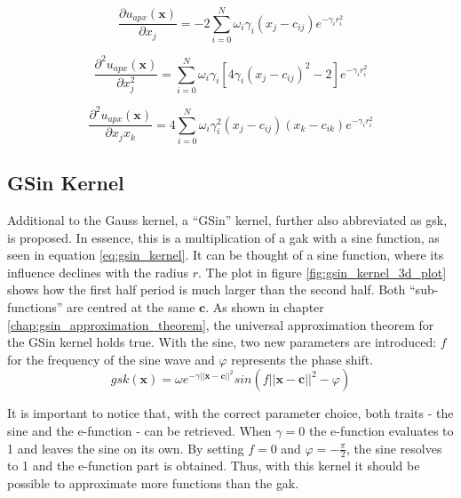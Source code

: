 \documentclass[./\jobname.tex]{subfiles}
\begin{document}
\begin{equation}
\label{eq:uapx_gauss_kernel_x0}
\frac{\partial u_{apx}(\mathbf{x})}{\partial x_j} = -2 \sum_{i=0}^{N} \omega_i \gamma_i (x_j - c_{ij}) e^{-\gamma_i r_i^2}
\end{equation}

\begin{equation}
\label{eq:uapx_gauss_kernel_x0x0}
\frac{\partial^2 u_{apx}(\mathbf{x})}{\partial x_j^2} = \sum_{i=0}^{N} \omega_i \gamma_i \left[ 4 \gamma_i (x_j - c_{ij})^2 - 2 \right] e^{-\gamma_i r_i^2}
\end{equation}

\begin{equation}
\label{eq:uapx_gauss_kernel_x0x1}
\frac{\partial^2 u_{apx}(\mathbf{x})}{\partial x_j x_k} = 4 \sum_{i=0}^{N} \omega_i \gamma_i^2 (x_j - c_{ij}) (x_k - c_{ik}) e^{-\gamma_i r_i^2} 
\end{equation}

\subsection{GSin Kernel}
\label{chap:gsin_kernel}
Additional to the Gauss kernel, a ``GSin'' kernel, further also abbreviated as \gls{gsk}, is proposed. In essence, this is a multiplication of a \gls{gak} with a sine function, as seen in equation \eqref{eq:gsin_kernel}. It can be thought of a sine function, where its influence declines with the radius $r$. The plot in figure \ref{fig:gsin_kernel_3d_plot} shows how the first half period is much larger than the second half. Both ``sub-functions'' are centred at the same $\mathbf{c}$. As shown in chapter \ref{chap:gsin_approximation_theorem}, the universal approximation theorem for the GSin kernel holds true. 
With the sine, two new parameters are introduced: $f$ for the frequency of the sine wave and $\varphi$ represents the phase shift. 
\begin{equation}
\label{eq:gsin_kernel}
gsk(\mathbf{x}) = \omega e^{-\gamma ||\mathbf{x} - \mathbf{c}||^2} sin(f ||\mathbf{x} - \mathbf{c}||^2 - \varphi)
\end{equation}

It is important to notice that, with the correct parameter choice, both traits - the sine and the e-function - can be retrieved. When $\gamma=0$ the e-function evaluates to 1 and leaves the sine on its own. By setting $f=0$ and $\varphi=-\frac{\pi}{2}$, the sine resolves to 1 and the e-function part is obtained. Thus, with this kernel it should be possible to approximate more functions than the \gls{gak}. 
\end{document}
